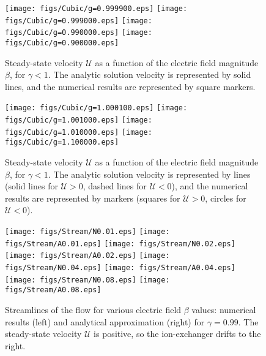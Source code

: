 \documentclass[final]{elsarticle}
\newcommand\cU{\mathscr{U}}
\begin{document}
\begin{figure}[htbp]
    \begin{center}
    \texttt{[image: figs/Cubic/g=0.999900.eps]}
    \texttt{[image: figs/Cubic/g=0.999000.eps]}
    \texttt{[image: figs/Cubic/g=0.990000.eps]}
    \texttt{[image: figs/Cubic/g=0.900000.eps]}
        \caption{Steady-state velocity $\cU$ as a function of the 
        electric field magnitude $\beta$, for $\gamma < 1$. 
        The analytic solution velocity is represented by solid lines, 
        and the numerical results are represented by square markers.}
	    \label{fig:Cubic1}
    \end{center}
\end{figure}
\begin{figure}[htbp]
    \begin{center}
    \texttt{[image: figs/Cubic/g=1.000100.eps]}
    \texttt{[image: figs/Cubic/g=1.001000.eps]}
    \texttt{[image: figs/Cubic/g=1.010000.eps]}
    \texttt{[image: figs/Cubic/g=1.100000.eps]}
        \caption{Steady-state velocity $\cU$ as a function of the 
        electric field magnitude $\beta$, for $\gamma < 1$. 
        The analytic solution velocity is represented by lines 
        (solid lines for $\cU > 0$, dashed lines for $\cU < 0$), 
        and the numerical results are represented by markers 
        (squares for $\cU > 0$, circles for $\cU < 0$).}
	    \label{fig:Cubic2}
    \end{center}
\end{figure}
\begin{figure}[htbp]
    \begin{center}
	\texttt{[image: figs/Stream/N0.01.eps]}
	\texttt{[image: figs/Stream/A0.01.eps]}
	\texttt{[image: figs/Stream/N0.02.eps]}
	\texttt{[image: figs/Stream/A0.02.eps]}
	\texttt{[image: figs/Stream/N0.04.eps]}
	\texttt{[image: figs/Stream/A0.04.eps]}
	\texttt{[image: figs/Stream/N0.08.eps]}
	\texttt{[image: figs/Stream/A0.08.eps]}
        \caption{Streamlines of the flow for various electric field $\beta$ values: 
        numerical results (left) and analytical approximation (right) for 
        $\gamma = 0.99$.  The steady-state velocity $\cU$ is positive, so the
        ion-exchanger drifts to the right. 
        }
    \label{fig:Vortex}
    \end{center}
\end{figure}
\end{document}
